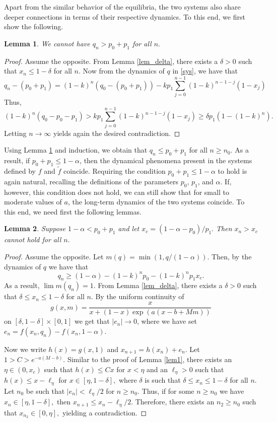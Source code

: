 \documentclass{article}
\theoremstyle{plain}
\newtheorem{lemma}{Lemma}
\theoremstyle{definition}
\begin{document}
Apart from the similar behavior of the equilibria, the two systems also share deeper connections in terms of their respective dynamics. To this end, we first show the following.
\begin{lemma}\label{lem2}
We cannot have $q_n>p_0+p_1$ for all $n.$
\end{lemma}
\begin{proof}
Assume the opposite. From Lemma \ref{lem_delta}, there exists a $\delta>0$ such that $x_n\leq 1-\delta$ for all $n.$ Now from the dynamics of $q$ in \eqref{sys}, we have that
\[
q_n-(p_0+p_1)=(1-k)^n (q_0-(p_0+p_1))-kp_1 \sum_{j=0}^{n-1} (1-k)^{n-1-j} (1-x_j)
\]
Thus,
\[
(1-k)^n(q_0-p_0-p_1)> kp_1 \sum_{j=0}^{n-1}(1-k)^{n-1-j}(1-x_j)\geq\delta p_1 (1-(1-k)^n).
\]
Letting $n\to \infty$ yields again the desired contradiction.   

\end{proof}

Using Lemma \ref{lem2} and induction, we obtain that $q_n\leq p_0+p_1$ for all $n\geq n_0$. As a result, if $p_0+p_1\leq 1-\alpha$, then the dynamical phenomena present in the systems defined by $f$ and $\tilde f$ coincide. Requiring the condition $p_0+p_1\leq 1-\alpha$ to hold is again natural, recalling the definitions of the parameters $p_0$, $p_1$, and $\alpha$. If, however, this condition does not hold, we can still show that for small to moderate values of $a$, the long-term dynamics of the two systems coincide. To this end, we need first the following lemmas.
\begin{lemma}\label{lem3}
Suppose $1-\alpha< p_0+p_1$ and let $x_c=(1-\alpha-p_0)/p_1.$ Then $x_n>x_c$ cannot hold for all $n.$
\end{lemma}

\begin{proof}
Assume the opposite. Let $m(q)=\min{\left(1,q/(1-\alpha) \right)}.$ Then, by the dynamics of $q$ we have that
\[
q_n\geq (1-\alpha)-(1-k)^np_0-(1-k)^np_1x_c.
\]
As a result, $\lim m(q_n)=1.$ From Lemma \ref{lem_delta}, there exists a $\delta>0$ such that $\delta\leq x_n\leq 1-\delta$ for all $n.$ By the uniform continuity of 
\[
g(x,m)=\frac{x}{x+(1-x)\exp{\left (a(x-b+Mm) \right)}}
\]
on $[\delta,1-\delta]\times [0,1]$ we get that $|e_n| \to 0$, where we have set $e_n=f(x_n,q_n)-f(x_n,1-\alpha)$. 

Now we write $h(x)=g(x,1)$ and $x_{n+1}=h(x_n)+e_n.$ Let $1>C>e^{-a(M-b)}$. Similar to the proof of Lemma \ref{lem1}, there exists an $\eta \in (0,x_c)$ such that $h(x)\leq Cx$ for $x< \eta$ and an $\ell_\eta>0$ such that $h(x)\leq x- \ell_\eta$ for $x\in[\eta,1-\delta],$ where $\delta$ is such that $\delta\leq x_n\leq 1-\delta$ for all $n.$ Let $n_0$ be such that $|e_n|< \ell_\eta/2$ for $n \geq n_0.$ Thus, if for some $n\geq n_0$ we have $x_n\in [\eta, 1-\delta],$ then $x_{n+1}\leq x_n-\ell_\eta/2.$ Therefore, there exists an $n_2\geq n_0$ such that $x_{n_2} \in [0,\eta],$ yielding a contradiction.

\end{proof}
\end{document}
